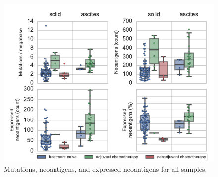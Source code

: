 \begin{figure}
\centering
\includegraphics[scale=1.0]{figures/counts.pdf}
\caption{Mutations, neoantigens, and expressed neoantigens for all samples.}
\label{fig:counts}
\end{figure}



